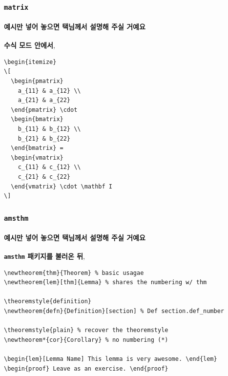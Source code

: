 \begin{frame}[fragile]
  \frametitle{\texttt{matrix}}
  \framesubtitle{예시만 넣어 놓으면 택님께서 설명해 주실 거예요}
  \textbf{수식 모드 안에서}, \vspace{-1em}
  \begin{verbatim}
\begin{itemize}
\[ 
  \begin{pmatrix}
    a_{11} & a_{12} \\  
    a_{21} & a_{22}
  \end{pmatrix} \cdot
  \begin{bmatrix}
    b_{11} & b_{12} \\  
    b_{21} & b_{22}
  \end{bmatrix} =
  \begin{vmatrix}
    c_{11} & c_{12} \\  
    c_{21} & c_{22}
  \end{vmatrix} \cdot \mathbf I
\]
  \end{verbatim}
\end{frame}

\begin{frame}[fragile]
  \frametitle{\texttt{amsthm}}
  \framesubtitle{예시만 넣어 놓으면 택님께서 설명해 주실 거예요}
  \textbf{\texttt{amsthm} 패키지를 불러온 뒤},\vspace{-1em}
  \begin{verbatim}
\newtheorem{thm}{Theorem} % basic usagae
\newtheorem{lem}[thm]{Lemma} % shares the numbering w/ thm

\theoremstyle{definition}
\newtheorem{defn}{Definition}[section] % Def section.def_number

\theoremstyle{plain} % recover the theoremstyle
\newtheorem*{cor}{Corollary} % no numbering (*)

\begin{lem}[Lemma Name] This lemma is very awesome. \end{lem}
\begin{proof} Leave as an exercise. \end{proof}
  \end{verbatim}
\end{frame}

